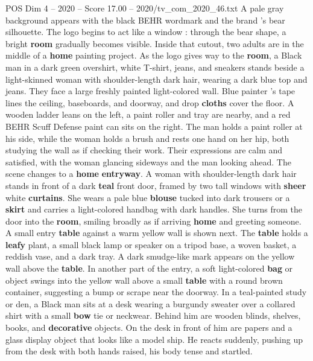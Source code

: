 \begin{textsample}{POS Dim 4 – 2020 – Score 17.00 – 2020/tv\_com\_2020\_46.txt}  \label{ex:f4_pos_010}
A pale gray background appears with the black BEHR wordmark and the brand ’s bear silhouette.
The logo begins to act like a window : through the bear shape, a bright \textbf{room} gradually becomes visible.
Inside that cutout, two adults are in the middle of a \textbf{home} painting project.
As the logo gives way to the \textbf{room}, a Black man in a dark green overshirt, white T-shirt, jeans, and sneakers stands beside a light-skinned woman with shoulder-length dark hair, wearing a dark blue top and jeans.
They face a large freshly painted light-colored wall.
Blue painter ’s tape lines the ceiling, baseboards, and doorway, and drop \textbf{cloths} cover the floor.
A wooden ladder leans on the left, a paint roller and tray are nearby, and a red BEHR Scuff Defense paint can sits on the right.
The man holds a paint roller at his side, while the woman holds a brush and rests one hand on her hip, both studying the wall as if checking their work.
Their expressions are calm and satisfied, with the woman glancing sideways and the man looking ahead.
The scene changes to a \textbf{home} \textbf{entryway}.
A woman with shoulder-length dark hair stands in front of a dark \textbf{teal} front door, framed by two tall windows with \textbf{sheer} white \textbf{curtains}.
She wears a pale blue \textbf{blouse} tucked into dark trousers or a \textbf{skirt} and carries a light-colored handbag with dark handles.
She turns from the door into the \textbf{room}, smiling broadly as if arriving \textbf{home} and greeting someone.
A small entry \textbf{table} against a warm yellow wall is shown next.
The \textbf{table} holds a \textbf{leafy} plant, a small black lamp or speaker on a tripod base, a woven basket, a reddish vase, and a dark tray.
A dark smudge-like mark appears on the yellow wall above the \textbf{table}.
In another part of the entry, a soft light-colored \textbf{bag} or object swings into the yellow wall above a small \textbf{table} with a round brown container, suggesting a bump or scrape near the doorway.
In a teal-painted study or den, a Black man sits at a desk wearing a burgundy sweater over a collared shirt with a small \textbf{bow} tie or neckwear.
Behind him are wooden blinds, shelves, books, and \textbf{decorative} objects.
On the desk in front of him are papers and a glass display object that looks like a model ship.
He reacts suddenly, pushing up from the desk with both hands raised, his body tense and startled.

\end{textsample}
